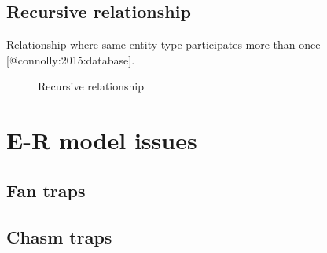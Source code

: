 \subsection{Recursive relationship}\label{recursive-relationship}

Relationship where same entity type participates more than once
{[}@connolly:2015:database{]}.

\begin{figure}[htbp]
  \centering
  \caption{Recursive relationship{}}
\end{figure}

\section{E-R model issues}\label{e-r-model-issues}

\subsection{Fan traps}\label{fan-traps}

\subsection{Chasm traps}\label{chasm-traps}


